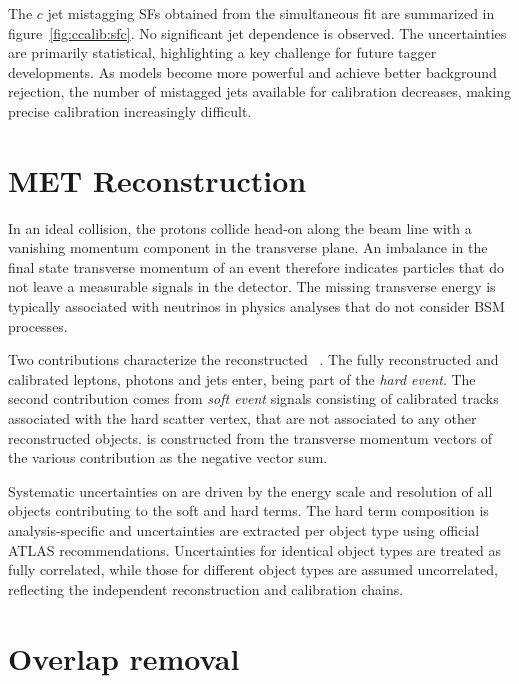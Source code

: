 The $c$ jet mistagging SFs obtained from the simultaneous fit are summarized in figure~\ref{fig:ccalib:sfc}. No significant jet \pt dependence is observed. The uncertainties are primarily statistical, highlighting a key challenge for future tagger developments. As models become more powerful and achieve better background rejection, the number of mistagged jets available for calibration decreases, making precise calibration increasingly difficult.

\clearpage

\section{MET Reconstruction}
\label{sec:reco:met}

In an ideal collision, the protons collide head-on along the beam line with a vanishing momentum component in the transverse plane.
An imbalance in the final state transverse momentum of an event therefore indicates particles that do not leave a measurable signals in the detector.
The missing transverse energy \ETmiss is typically associated with neutrinos
in physics analyses that do not consider BSM processes.

Two contributions characterize the reconstructed \ETmiss~\cite{JETM-2020-03}.
The fully reconstructed and calibrated leptons, photons and jets enter, being part of the
\textit{hard event}. The second contribution comes from  \textit{soft event} signals
consisting of calibrated tracks associated with the hard scatter vertex, that are not associated to any other reconstructed objects.
\ETmiss is constructed from the transverse momentum vectors of the various contribution as the negative vector sum.

Systematic uncertainties on
\ETmiss are driven by the energy scale and resolution of all objects contributing to the soft and hard terms. The hard term composition is analysis-specific and uncertainties are extracted per object type using official ATLAS recommendations. 
Uncertainties for identical object types are treated as fully correlated, while those for different object types are assumed uncorrelated, reflecting the independent reconstruction and calibration chains.

\section{Overlap removal}
\label{sec:ObjRec:OR}

